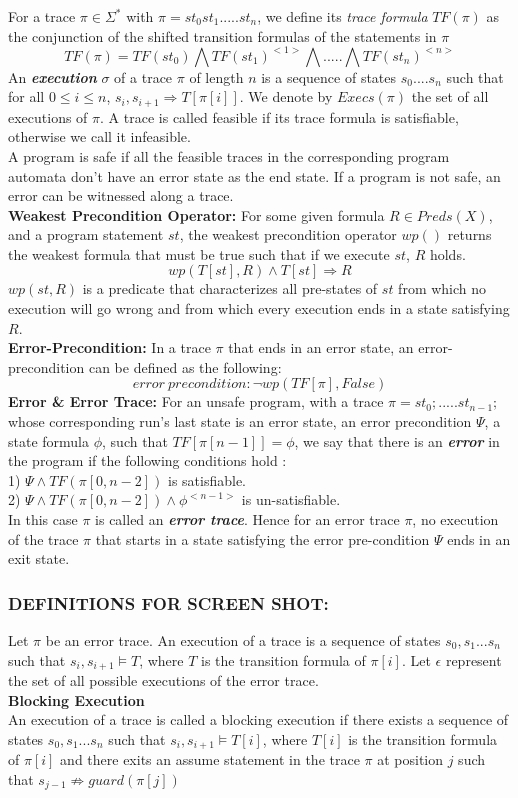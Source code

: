 \documentclass{article}
\newcommand{\limp}{\Rightarrow}
\begin{document}
For a trace $\pi \in \Sigma^*$ with $\pi = st_0st_1.....st_n$, we define its \textit{trace formula} $TF(\pi)$ as the conjunction of the shifted transition formulas of the statements in $\pi$
$$TF(\pi) = TF(st_0) \bigwedge TF(st_1)^{<1>} \bigwedge ..... \bigwedge TF(st_n)^{<n>}$$
An \textit{\textbf{execution}} $\sigma$ of a trace $\pi$ of length $n$ is a sequence of states $s_0....s_n$ such that for all $0 \leq i \leq n$, $s_i,s_{i+1} \Rightarrow T[\pi[i]]$. We denote by $Execs(\pi)$ the set of all executions of $\pi$.
A trace is called feasible if its trace formula is satisfiable, otherwise we call it infeasible. \\
A program is safe if all the feasible traces in the corresponding program automata don’t have an error state as the end state. If a program is not safe, an error can be witnessed along a trace.\\
\textbf{Weakest Precondition Operator:} For some given formula $R \in Preds(X)$, and a program statement $st$, the weakest precondition operator $wp()$ returns the weakest formula that must be true such that if we execute $st$, $R$ holds. 
$$wp(T[st],R) \wedge T[st] \Rightarrow R$$
$wp(st,R)$ is a predicate that characterizes all pre-states of $st$ from which no execution will go wrong and from which every execution ends in a state satisfying $R$.\\
\textbf{Error-Precondition:} In a trace $\pi$ that ends in an error state, an error-precondition can be defined as the following:
$$error\ precondition:\neg wp(TF[\pi],False)$$
\textbf{Error \& Error Trace: }For an unsafe program, with a trace $\pi = st_0;.....st_{n-1};$ whose corresponding run's last state is an error state, an error precondition $\Psi$, a state formula $\phi$, such that $TF[\pi[n-1]]=\phi$, we say that there is an \textbf{\textit{error}} in the program if the following conditions hold :\\
1) $\Psi \wedge TF(\pi[0,n-2])$ is satisfiable.\\
2) $\Psi \wedge TF(\pi[0,n-2]) \wedge \phi^{<n-1>} $ is un-satisfiable.\\
In this case $\pi$ is called an \textbf{\textit{error trace}}. Hence for an error trace $\pi$, no execution of the trace $\pi$ that starts in a state satisfying the error pre-condition $\Psi$ ends in an exit state.\\


\newpage
\subsubsection{DEFINITIONS FOR SCREEN SHOT:}
Let $\pi$ be an error trace. An execution of a trace is a sequence of states $s_0, s_1...s_n$ such that $s_i, s_{i+1} \models T$, where $T$ is the transition formula of $\pi[i]$. Let $\epsilon$ represent the set of all possible executions of the error trace. \\
\textbf{Blocking Execution} \\
An execution of a trace is called a blocking execution if there exists a sequence of states $s_0, s_1...s_n$ such that $s_i, s_{i+1} \models T[i]$, where $T[i]$ is the transition formula of $\pi[i]$ and there exits an assume statement in the trace $\pi$ at position $j$ such that $s_{j-1} \not \limp guard(\pi[j])$
\end{document}
